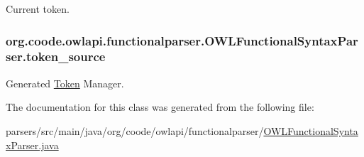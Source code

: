 Current token. \hypertarget{classorg_1_1coode_1_1owlapi_1_1functionalparser_1_1_o_w_l_functional_syntax_parser_a2b865f1ff7a502bc9f8e8d51acef4da7}{
\subsubsection[{token\-\_\-source}]{ org.\-coode.\-owlapi.\-functionalparser.\-O\-W\-L\-Functional\-Syntax\-Parser.\-token\-\_\-source}}\label{classorg_1_1coode_1_1owlapi_1_1functionalparser_1_1_o_w_l_functional_syntax_parser_a2b865f1ff7a502bc9f8e8d51acef4da7}
Generated \hyperlink{classorg_1_1coode_1_1owlapi_1_1functionalparser_1_1_token}{Token} Manager. 

The documentation for this class was generated from the following file\-:\begin{DoxyCompactItemize}
\item 
parsers/src/main/java/org/coode/owlapi/functionalparser/\hyperlink{_o_w_l_functional_syntax_parser_8java}{O\-W\-L\-Functional\-Syntax\-Parser.\-java}\end{DoxyCompactItemize}
